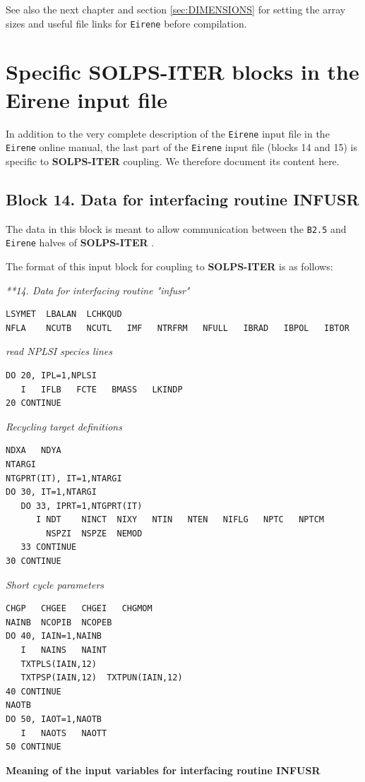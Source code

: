 \documentclass[a4paper,10pt]{report}
\newcommand\SOLPSITER{{\bf SOLPS-ITER} }
\begin{document}
See also the next chapter and section \ref{sec:DIMENSIONS} for setting the array sizes
and useful file links for {\tt Eirene} before compilation.

\section{Specific SOLPS-ITER blocks in the Eirene input file}

In addition to the very complete description of the {\tt Eirene} input file in the {\tt Eirene} online manual, the last part of the {\tt Eirene} input file (blocks 14 and 15) is specific to \SOLPSITER coupling. We therefore document its content here.

\subsection{Block 14. Data for interfacing routine INFUSR}

The data in this block is meant to allow communication between the {\tt B2.5} and {\tt Eirene} halves of \SOLPSITER.

The format of this input block for coupling to \SOLPSITER is as follows:

{\it ***14. Data for interfacing routine "infusr"}
\begin{verbatim}
LSYMET  LBALAN  LCHKQUD
NFLA    NCUTB   NCUTL   IMF   NTRFRM   NFULL   IBRAD   IBPOL   IBTOR
\end{verbatim}
{\it read NPLSI species lines}
\begin{verbatim}
DO 20, IPL=1,NPLSI
   I   IFLB   FCTE   BMASS   LKINDP
20 CONTINUE
\end{verbatim}
{\it Recycling target definitions}
\begin{verbatim}
NDXA   NDYA
NTARGI
NTGPRT(IT), IT=1,NTARGI
DO 30, IT=1,NTARGI
   DO 33, IPRT=1,NTGPRT(IT)
      I NDT    NINCT  NIXY   NTIN   NTEN   NIFLG   NPTC   NPTCM
        NSPZI  NSPZE  NEMOD
   33 CONTINUE
30 CONTINUE
\end{verbatim}
{\it Short cycle parameters}
\begin{verbatim}
CHGP   CHGEE   CHGEI   CHGMOM
NAINB  NCOPIB  NCOPEB
DO 40, IAIN=1,NAINB
   I   NAINS   NAINT
   TXTPLS(IAIN,12)
   TXTPSP(IAIN,12)  TXTPUN(IAIN,12)
40 CONTINUE
NAOTB
DO 50, IAOT=1,NAOTB
   I   NAOTS   NAOTT
50 CONTINUE
\end{verbatim}

{\bf Meaning of the input variables for interfacing routine INFUSR}
\end{document}

